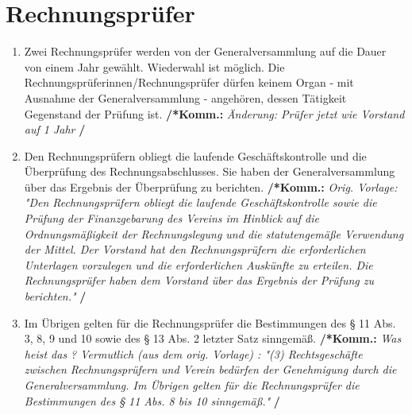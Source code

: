 \documentclass[a4paper,12pt]{article}
\newcommand{\comment}[1]{{\bf /*Komm.:} \textit{#1} {\bf */}}
\begin{document}
\section{Rechnungsprüfer} %
\begin{enumerate}
\item Zwei Rechnungsprüfer werden von der Generalversammlung auf die Dauer von einem Jahr gewählt. Wiederwahl ist möglich. Die
Rechnungsprüferinnen/Rechnungsprüfer dürfen keinem Organ - mit Ausnahme
der Generalversammlung - angehören, dessen Tätigkeit Gegenstand der
Prüfung ist.
\comment{Änderung: Prüfer jetzt wie Vorstand auf 1 Jahr}

\item Den Rechnungsprüfern obliegt die laufende Geschäftskontrolle und die Überprüfung des Rechnungsabschlusses. Sie haben der Generalversammlung über das Ergebnis der Überprüfung zu berichten.
\comment{Orig. Vorlage: "Den Rechnungsprüfern obliegt die laufende Geschäftskontrolle sowie die Prüfung der Finanzgebarung des Vereins im Hinblick auf die Ordnungsmäßigkeit der Rechnungslegung und die statutengemäße Verwendung der Mittel. Der Vorstand hat den Rechnungsprüfern die erforderlichen Unterlagen vorzulegen und die erforderlichen Auskünfte zu erteilen. Die Rechnungsprüfer haben dem Vorstand über das Ergebnis der Prüfung zu berichten."}

\item Im Übrigen gelten für die Rechnungsprüfer die Bestimmungen des § 11 Abs. 3, 8, 9 und 10 sowie des § 13 Abs. 2 letzter Satz sinngemäß.
\comment{Was heist das ? Vermutlich (aus dem orig. Vorlage) : "(3) Rechtsgeschäfte zwischen Rechnungsprüfern und Verein bedürfen der Genehmigung durch die Generalversammlung. Im Übrigen gelten für die Rechnungsprüfer die Bestimmungen des § 11 Abs. 8 bis 10 sinngemäß."}

\end{enumerate}
\end{document}
